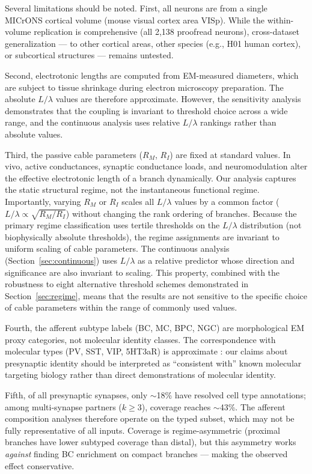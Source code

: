 \documentclass[11pt]{article}
\begin{document}
Several limitations should be noted. First, all neurons are from a single MICrONS cortical volume (mouse visual cortex area VISp). While the within-volume replication is comprehensive (all 2,138 proofread neurons), cross-dataset generalization --- to other cortical areas, other species (e.g., H01 human cortex), or subcortical structures --- remains untested.

Second, electrotonic lengths are computed from EM-measured diameters, which are subject to tissue shrinkage during electron microscopy preparation. The absolute $L/\lambda$ values are therefore approximate. However, the sensitivity analysis demonstrates that the coupling is invariant to threshold choice across a wide range, and the continuous analysis uses relative $L/\lambda$ rankings rather than absolute values.

Third, the passive cable parameters ($R_M$, $R_I$) are fixed at standard values. In vivo, active conductances, synaptic conductance loads, and neuromodulation alter the effective electrotonic length of a branch dynamically. Our analysis captures the static structural regime, not the instantaneous functional regime. Importantly, varying $R_M$ or $R_I$ scales all $L/\lambda$ values by a common factor ($L/\lambda \propto \sqrt{R_M / R_I}$) without changing the rank ordering of branches. Because the primary regime classification uses tertile thresholds on the $L/\lambda$ distribution (not biophysically absolute thresholds), the regime assignments are invariant to uniform scaling of cable parameters. The continuous analysis (Section~\ref{sec:continuous}) uses $L/\lambda$ as a relative predictor whose direction and significance are also invariant to scaling. This property, combined with the robustness to eight alternative threshold schemes demonstrated in Section~\ref{sec:regime}, means that the results are not sensitive to the specific choice of cable parameters within the range of commonly used values.

Fourth, the afferent subtype labels (BC, MC, BPC, NGC) are morphological EM proxy categories, not molecular identity classes. The correspondence with molecular types (PV, SST, VIP, 5HT3aR) is approximate \citep{schneider2023}: our claims about presynaptic identity should be interpreted as ``consistent with'' known molecular targeting biology rather than direct demonstrations of molecular identity.

Fifth, of all presynaptic synapses, only $\sim$18\% have resolved cell type annotations; among multi-synapse partners ($k \geq 3$), coverage reaches $\sim$43\%. The afferent composition analyses therefore operate on the typed subset, which may not be fully representative of all inputs. Coverage is regime-asymmetric (proximal branches have lower subtyped coverage than distal), but this asymmetry works \textit{against} finding BC enrichment on compact branches --- making the observed effect conservative.
\end{document}
